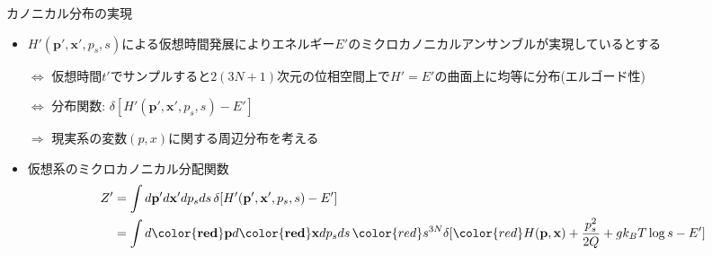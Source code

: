
\begin{frame}[t,fragile]{カノニカル分布の実現}
  \begin{itemize}
  \item $H'(\mathbf{p}',\mathbf{x}',p_s,s)$による仮想時間発展によりエネルギー$E'$のミクロカノニカルアンサンブルが実現しているとする

    $\Leftrightarrow$ 仮想時間$t'$でサンプルすると$2(3N+1)$次元の位相空間上で$H'=E'$の曲面上に均等に分布(エルゴード性)
    
    $\Leftrightarrow$ 分布関数: $\delta [ H'(\mathbf{p}',\mathbf{x}',p_s,s) - E']$
    
    $\Rightarrow$ 現実系の変数$(p,x)$に関する周辺分布を考える
  \item 仮想系のミクロカノニカル分配関数
    \begin{align*}
      Z'&=\int d\mathbf{p}' d\mathbf{x}' dp_s ds \, \delta [ H'(\mathbf{p}',\mathbf{x}',p_s,s) - E'] \\
      &=\int d\mathbf{{\color{red}p}} d\mathbf{{\color{red}x}} dp_s ds \, {\color{red}s^{3N}} \delta [ {\color{red}H(\mathbf{p},\mathbf{x})} + \frac{p_s^2}{2Q} + g k_B T \log s - E']
    \end{align*}
  \end{itemize}
\end{frame}
